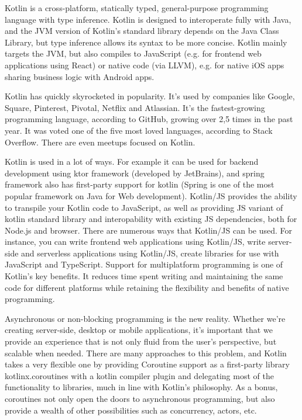 \par Kotlin is a cross-platform, statically typed, general-purpose programming language with type inference. Kotlin is designed to interoperate fully with Java, and the JVM version of Kotlin's standard library depends on the Java Class Library, but type inference allows its syntax to be more concise. Kotlin mainly targets the JVM, but also compiles to JavaScript (e.g. for frontend web applications using React) or native code (via LLVM), e.g. for native iOS apps sharing business logic with Android apps. %

\par Kotlin has quickly skyrocketed in popularity. It's used by companies like Google, Square, Pinterest, Pivotal, Netflix and Atlassian. It's the fastest-growing programming language, according to GitHub, growing over 2,5 times in the past year. It was voted one of the five most loved languages, according to Stack Overflow. There are even meetups focused on Kotlin. 
\par Kotlin is used in a lot of ways. For example it can be used for backend development using ktor framework (developed by JetBrains), and spring framework also has first-party support for kotlin (Spring is one of the most popular framework on Java for Web development). Kotlin/JS provides the ability to transpile your Kotlin code to JavaScript, as well as providing JS variant of kotlin standard library and interopability with existing JS dependencies, both for Node.js and browser. There are numerous ways that Kotlin/JS can be used. For instance, you can write frontend web applications using Kotlin/JS,
write server-side and serverless applications using Kotlin/JS, create libraries for use with JavaScript and TypeScript. Support for multiplatform programming is one of Kotlin’s key benefits. It reduces time spent writing and maintaining the same code for different platforms while retaining the flexibility and benefits of native programming. 

\par Asynchronous or non-blocking programming is the new reality. Whether we're creating server-side, desktop or mobile applications, it's important that we provide an experience that is not only fluid from the user's perspective, but scalable when needed.
There are many approaches to this problem, and Kotlin takes a very flexible one by providing Coroutine support as a first-party library kotlinx.coroutines with a kotlin compiler plugin and delegating most of the functionality to libraries, much in line with Kotlin's philosophy.
As a bonus, coroutines not only open the doors to asynchronous programming, but also provide a wealth of other possibilities such as concurrency, actors, etc.

